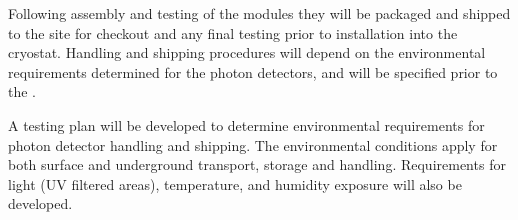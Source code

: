 






Following assembly and testing of the  modules they will be packaged and shipped to the  site for checkout and any final testing prior to installation into the cryostat. Handling and shipping procedures will depend on the environmental requirements determined for the photon detectors, and will be specified prior to the .

A testing plan will be developed to determine environmental requirements for photon detector handling and shipping. The environmental conditions apply for both surface and underground transport, storage and handling. Requirements for light (UV filtered areas), temperature, and humidity exposure will also be developed.

